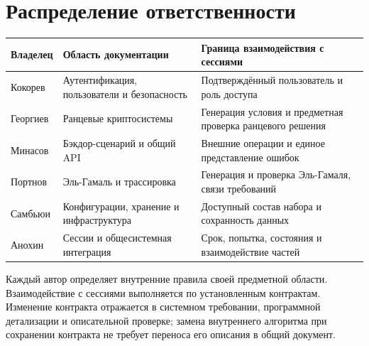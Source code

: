 \documentclass[12pt,a4paper]{article}
\begin{document}
\section{Распределение ответственности}\label{5-ux440ux430ux441ux43fux440ux435ux434ux435ux43bux435ux43dux438ux435-ux43eux442ux432ux435ux442ux441ux442ux432ux435ux43dux43dux43eux441ux442ux438}

\hypertarget{5-распределение-ответственности}{}

{\def\LTcaptype{none} %
\begin{longtable}[]{@{}
  >{\raggedright\arraybackslash}p{}
  >{\raggedright\arraybackslash}p{}
  >{\raggedright\arraybackslash}p{}@{}}
\toprule\noalign{}
\begin{minipage}[b]{\linewidth}\raggedright
Владелец
\end{minipage} & \begin{minipage}[b]{\linewidth}\raggedright
Область документации
\end{minipage} & \begin{minipage}[b]{\linewidth}\raggedright
Граница взаимодействия с сессиями
\end{minipage} \\
\midrule\noalign{}
\endhead
\bottomrule\noalign{}
\endlastfoot
Кокорев & Аутентификация, пользователи и безопасность & Подтверждённый пользователь и роль доступа \\
Георгиев & Ранцевые криптосистемы & Генерация условия и предметная проверка ранцевого решения \\
Минасов & Бэкдор-сценарий и общий API & Внешние операции и единое представление ошибок \\
Портнов & Эль-Гамаль и трассировка & Генерация и проверка Эль-Гамаля, связи требований \\
Самбьюи & Конфигурации, хранение и инфраструктура & Доступный состав набора и сохранность данных \\
Анохин & Сессии и общесистемная интеграция & Срок, попытка, состояния и взаимодействие частей \\
\end{longtable}
}

Каждый автор определяет внутренние правила своей предметной области. Взаимодействие с сессиями выполняется по установленным контрактам. Изменение контракта отражается в системном требовании, программной детализации и описательной проверке; замена внутреннего алгоритма при сохранении контракта не требует переноса его описания в общий документ.
\end{document}
